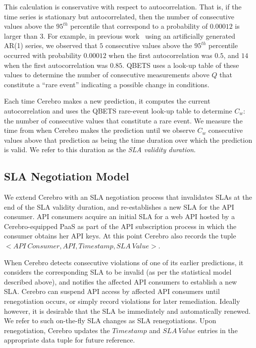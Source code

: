 This calculation is conservative with respect to autocorrelation. That is, if
the time series is stationary but autocorrelated, then the number of consecutive 
values above the $95^{th}$ percentile that correspond to a probability of
$0.00012$ is larger than $3$.  For example, in previous
work~\cite{Nurmi:2007:QQB:1791551.1791556}
using an artificially generated AR(1) series, 
we observed that $5$ consecutive values above the $95^{th}$ percentile
occurred with probability $0.00012$ when the first autocorrelation was $0.5$,
and $14$ when the first autocorrelation was $0.85$. QBETS uses a look-up
table of these values to determine the number of consecutive measurements above
$Q$ that constitute a ``rare event'' indicating a possible change in conditions.

Each time Cerebro makes a new prediction, it computes the current
autocorrelation and uses the QBETS rare-event look-up table to determine $C_{w}$:
the number of consecutive values that constitute a rare event.
We measure the time from when
Cerebro makes the prediction until we observe $C_{w}$ 
consecutive values above that prediction 
as being the time duration over which
the prediction is valid. 
We refer to this duration as the \textit{SLA validity duration}.  


\vspace{-0.1in}
\subsection{ SLA Negotiation Model}
\vspace{-0.1in}
We extend Cerebro with an SLA negotiation process that invalidates SLAs at the end of the
SLA validity duration, and re-establishes a new SLA for the API consumer.
API consumers acquire an initial SLA for a web API hosted by a Cerebro-equipped PaaS
as part of the API subscription process in which the consumer obtains her API keys.
At this point Cerebro also records the 
tuple $<API\ Consumer, API, Timestamp, SLA\ Value>$.

When Cerebro detects consecutive violations of one of its earlier predictions,
it considers the corresponding SLA to be invalid (as per the statistical model described above), 
and notifies the affected API consumers to establish a 
new SLA. Cerebro can suspend API access by affected API consumers until 
renegotiation occurs, or simply record violations for later remediation.
Ideally however, it is desirable that the SLA be immediately and automatically 
renewed. We refer to such on-the-fly
SLA changes as SLA renegotiations. Upon renegotiation, 
Cerebro updates the $Timestamp$ and $SLA\ Value$ entries
in the appropriate data tuple for future reference.


